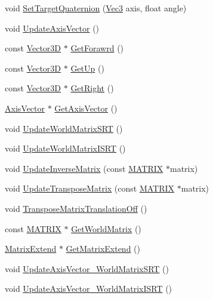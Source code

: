 \begin{DoxyCompactItemize}
\item 
void \mbox{\hyperlink{class_transform_ac8cdb5ca9995d9c124f1890d84c92ab4}{Set\+Target\+Quaternion}} (\mbox{\hyperlink{_vector3_d_8h_ab16f59e4393f29a01ec8b9bbbabbe65d}{Vec3}} axis, float angle)
\item 
void \mbox{\hyperlink{class_transform_afe5350bb1558256115e14c0669611acd}{Update\+Axis\+Vector}} ()
\item 
const \mbox{\hyperlink{class_vector3_d}{Vector3D}} $\ast$ \mbox{\hyperlink{class_transform_a25e4832e15334d74ff847f0ff0b3564f}{Get\+Forawrd}} ()
\item 
const \mbox{\hyperlink{class_vector3_d}{Vector3D}} $\ast$ \mbox{\hyperlink{class_transform_a9f5700481ae42556f763726947feaf36}{Get\+Up}} ()
\item 
const \mbox{\hyperlink{class_vector3_d}{Vector3D}} $\ast$ \mbox{\hyperlink{class_transform_a57d1da919d8df7d2452149c4bbade4d2}{Get\+Right}} ()
\item 
\mbox{\hyperlink{class_axis_vector}{Axis\+Vector}} $\ast$ \mbox{\hyperlink{class_transform_ad300be34dddc6109ca142452e65aa77d}{Get\+Axis\+Vector}} ()
\item 
void \mbox{\hyperlink{class_transform_af1a2dcb4a9d37dd71c203ec248535887}{Update\+World\+Matrix\+S\+RT}} ()
\item 
void \mbox{\hyperlink{class_transform_a3d56e19fba7f44d5f938d62481846fbc}{Update\+World\+Matrix\+I\+S\+RT}} ()
\item 
void \mbox{\hyperlink{class_transform_a3d2e5da24fb1c8015f5bb9a6c0a7a7de}{Update\+Inverse\+Matrix}} (const \mbox{\hyperlink{_vector3_d_8h_a032295cd9fb1b711757c90667278e744}{M\+A\+T\+R\+IX}} $\ast$matrix)
\item 
void \mbox{\hyperlink{class_transform_a486ae5501b5081b22ee053f787e0e4a2}{Update\+Transpose\+Matrix}} (const \mbox{\hyperlink{_vector3_d_8h_a032295cd9fb1b711757c90667278e744}{M\+A\+T\+R\+IX}} $\ast$matrix)
\item 
void \mbox{\hyperlink{class_transform_a053037b225e6fb11e680cc60df15dd45}{Transpose\+Matrix\+Translation\+Off}} ()
\item 
const \mbox{\hyperlink{_vector3_d_8h_a032295cd9fb1b711757c90667278e744}{M\+A\+T\+R\+IX}} $\ast$ \mbox{\hyperlink{class_transform_a060f9487a18ad34549eab53a7ca5100d}{Get\+World\+Matrix}} ()
\item 
\mbox{\hyperlink{class_matrix_extend}{Matrix\+Extend}} $\ast$ \mbox{\hyperlink{class_transform_ab1101d4467d772f3ddc0558586e39c79}{Get\+Matrix\+Extend}} ()
\item 
void \mbox{\hyperlink{class_transform_af02515be1947506212ca1c23223ce0b3}{Update\+Axis\+Vector\+\_\+\+World\+Matrix\+S\+RT}} ()
\item 
void \mbox{\hyperlink{class_transform_a73a20f2b8baad21ba74a2b1c6d8a1ab2}{Update\+Axis\+Vector\+\_\+\+World\+Matrix\+I\+S\+RT}} ()
\end{DoxyCompactItemize}


